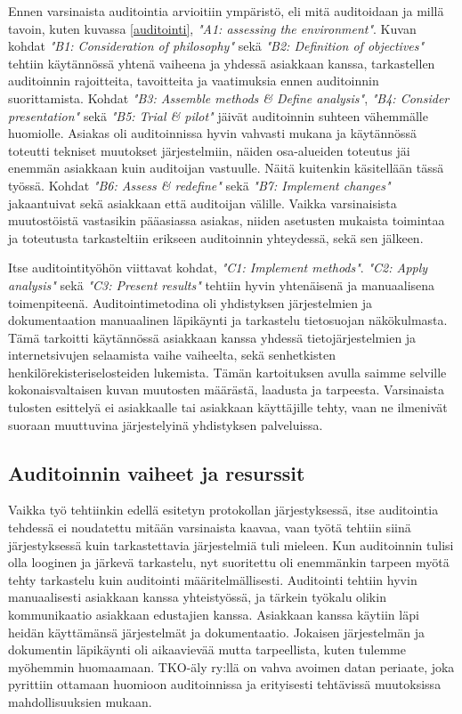 \documentclass[finnish]{tktltiki}
\begin{document}
Ennen varsinaista auditointia arvioitiin ympäristö, eli mitä auditoidaan ja millä tavoin, kuten kuvassa \ref{auditointi}, \textit{"A1: assessing the environment"}. Kuvan kohdat \textit{"B1: Consideration of philosophy"} sekä \textit{"B2: Definition of objectives"} tehtiin käytännössä yhtenä vaiheena ja yhdessä asiakkaan kanssa, tarkastellen auditoinnin rajoitteita, tavoitteita ja vaatimuksia ennen auditoinnin suorittamista. Kohdat \textit{"B3: Assemble methods \& Define analysis"}, \textit{"B4: Consider presentation"} sekä \textit{"B5: Trial \& pilot"} jäivät auditoinnin suhteen vähemmälle huomiolle. Asiakas oli auditoinnissa hyvin vahvasti mukana ja käytännössä toteutti tekniset muutokset järjestelmiin, näiden osa-alueiden toteutus jäi enemmän asiakkaan kuin auditoijan vastuulle. Näitä kuitenkin käsitellään tässä työssä. Kohdat \textit{"B6: Assess \& redefine"} sekä \textit{"B7: Implement changes"} jakaantuivat sekä asiakkaan että auditoijan välille. Vaikka varsinaisista muutostöistä vastasikin pääasiassa asiakas, niiden asetusten mukaista toimintaa ja toteutusta tarkasteltiin erikseen auditoinnin yhteydessä, sekä sen jälkeen. 

Itse auditointityöhön viittavat kohdat, \textit{"C1: Implement methods"}. \textit{"C2: Apply analysis"} sekä \textit{"C3: Present results"} tehtiin hyvin yhtenäisenä ja manuaalisena toimenpiteenä. Auditointimetodina oli yhdistyksen järjestelmien ja dokumentaation manuaalinen läpikäynti ja tarkastelu tietosuojan näkökulmasta. Tämä tarkoitti käytännössä asiakkaan kanssa yhdessä tietojärjestelmien ja internetsivujen selaamista vaihe vaiheelta, sekä senhetkisten henkilörekisteriselosteiden lukemista. Tämän kartoituksen avulla saimme selville kokonaisvaltaisen kuvan muutosten määrästä, laadusta ja tarpeesta. Varsinaista tulosten esittelyä ei asiakkaalle tai asiakkaan käyttäjille tehty, vaan ne ilmenivät suoraan muuttuvina järjestelyinä yhdistyksen palveluissa.

\subsection{Auditoinnin vaiheet ja resurssit}

Vaikka työ tehtiinkin edellä esitetyn protokollan järjestyksessä, itse auditointia tehdessä ei noudatettu mitään varsinaista kaavaa, vaan työtä tehtiin siinä järjestyksessä kuin tarkastettavia järjestelmiä tuli mieleen. Kun auditoinnin tulisi olla looginen ja järkevä tarkastelu, nyt suoritettu oli enemmänkin tarpeen myötä tehty tarkastelu kuin auditointi määritelmällisesti.  Auditointi tehtiin hyvin manuaalisesti asiakkaan kanssa yhteistyössä,  ja tärkein työkalu olikin kommunikaatio asiakkaan edustajien kanssa. Asiakkaan kanssa käytiin läpi heidän käyttämänsä järjestelmät ja dokumentaatio. Jokaisen järjestelmän ja dokumentin läpikäynti oli aikaavievää mutta tarpeellista, kuten tulemme myöhemmin huomaamaan. TKO-äly ry:llä on vahva avoimen datan periaate, joka pyrittiin ottamaan huomioon auditoinnissa ja erityisesti tehtävissä muutoksissa mahdollisuuksien mukaan.
\end{document}
